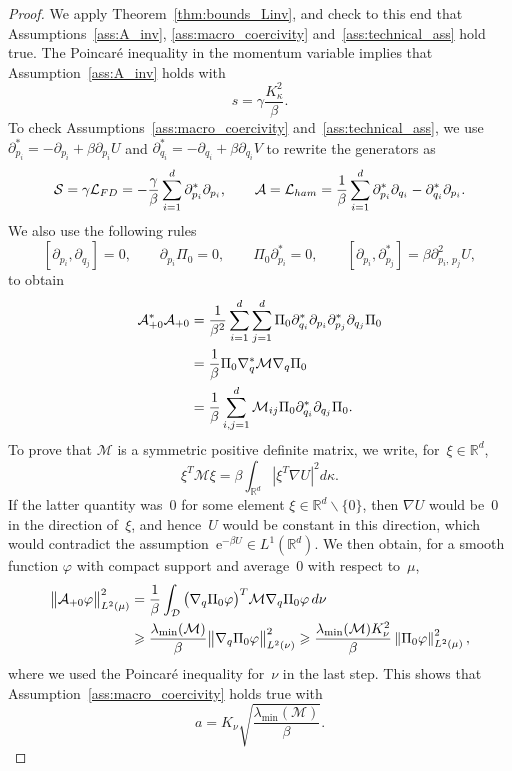\documentclass[10pt,a4paper]{article}
\numberwithin{equation}{section}
\newcommand{\rme}{\mathrm{e}}
\newcommand{\cLs}{\mathcal{S}}
\newcommand{\cLa}{\mathcal{A}}
\newcommand{\cD}{\mathcal{D}}
\newcommand{\cLM}{\mathcal{M}}
\newcommand{\R}{\mathbb{R}}
\newcommand{\cLham}{\mathcal{L}_{\rm ham}}
\newcommand{\cLFD}{\mathcal{L}_{\rm FD}}
\newcommand{\subplus}{\textnormal{\texttt{+}}}
\renewcommand{\geq}{\geqslant}
\begin{document}
\begin{proof}
We apply Theorem~\ref{thm:bounds_Linv}, and check to this end that Assumptions~\ref{ass:A_inv}, \ref{ass:macro_coercivity} and~\ref{ass:technical_ass} hold true. The Poincaré inequality in the momentum variable implies that Assumption~\ref{ass:A_inv} holds with
\[
s = \gamma \frac{K_\kappa^2}{\beta}.
\]
To check Assumptions~\ref{ass:macro_coercivity} and~\ref{ass:technical_ass}, we use $\partial_{p_i}^* = -\partial_{p_i} + \beta \partial_{p_i} U$ and $\partial_{q_i}^* = -\partial_{q_i} + \beta \partial_{q_i} V$ to rewrite the generators as
\[
\cLs = \gamma \cLFD = -\frac \gamma \beta \sum_{i=1}^d \partial_{p_i}^* \partial_{p_i},
\qquad \cLa = \cLham = \frac{1}{\beta} \sum_{i=1}^d \partial_{p_i}^* \partial_{q_i} - \partial_{q_i}^* \partial_{p_i}.
\]
We also use the following rules
\[
\left[\partial_{p_{i}}, \partial_{q_{j}}\right] = 0, \qquad \partial_{p_i} \Pi_0 = 0, \qquad \Pi_0 \partial_{p_i}^* = 0, \qquad \left[\partial_{p_i},\partial_{p_j}^*\right] = \beta \partial_{p_i,\,p_j}^2 U,
\]
to obtain
\begin{equation}\label{eq:A^*A_Langevin}
\begin{split}
\cLa_{\subplus 0}^*\cLa_{\subplus 0} &= \frac 1 {\beta^{2}} \sum_{i=1}^{d} \sum_{j=1}^{d} \Pi_{0} \partial_{q_{i}}^{*} \partial_{p_{i}} \partial_{p_{j}}^{*} \partial_{q_{j}} \Pi_{0}\\
 &= \frac1\beta \Pi_{0} \nabla_q^* \cLM \nabla_q \Pi_0 \\
& = \frac1\beta \sum_{i,j=1}^d \cLM_{ij} \Pi_{0} \partial_{q_i}^* \partial_{q_j} \Pi_0.
\end{split}
\end{equation}
To prove that $\cLM$ is a symmetric positive definite matrix, we write, for~$\xi \in \R^d$,
\[
\xi^T \cLM \xi = \beta \int_{\R^d} \left|\xi^T \nabla U\right|^2 d\kappa.
\]
If the latter quantity was~0 for some element $\xi \in \R^d \backslash \{0\}$, then $\nabla U$ would be~0 in the direction of~$\xi$, and hence~$U$ would be constant in this direction, which would contradict the assumption~$\rme^{-\beta U} \in L^1(\R^d)$. We then obtain, for a smooth function $\varphi$ with compact support and average~0 with respect to~$\mu$,
\begin{align*}
\big\|\cLa_{\subplus 0}\varphi\big\|_{L^2(\mu)}^2 & = \frac{1}{\beta}\int_\cD \big(\nabla_q \Pi_0 \varphi\big)^T \cLM \nabla_q \Pi_0 \varphi \, d\nu \\
& \geq \frac{\lambda_{\min}(\cLM)}{\beta} \big\| \nabla_q \Pi_0 \varphi \big\|^2_{L^2(\nu)} \geq \frac{\lambda_{\min}(\cLM) K_\nu^2}{\beta} \left\|\Pi_0 \varphi\right\|_{L^2(\mu)}^2,
\end{align*}
where we used the Poincaré inequality for~$\nu$ in the last step. This shows that Assumption~\ref{ass:macro_coercivity} holds true with
\[
a = K_\nu \sqrt{\frac{\lambda_{\min}(\cLM)}{\beta}}.
\]


\end{proof}
\end{document}
